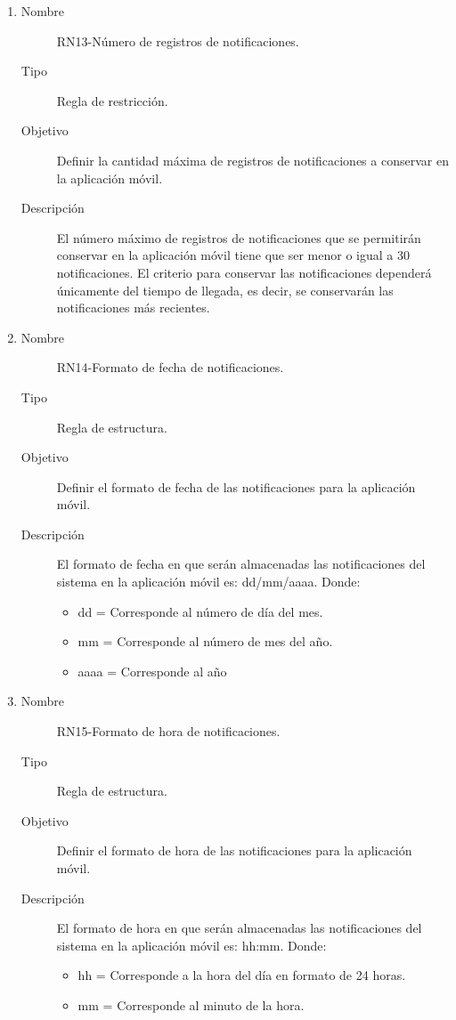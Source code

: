 \begin{enumerate}[label=RN\arabic*.]
\item \label{RN13}
		\begin{description}
			\item[Nombre] RN13-Número de registros de notificaciones.
			\item[Tipo] Regla de restricción.
			\item[Objetivo] Definir la cantidad máxima de registros de notificaciones a conservar en la aplicación móvil.
			\item[Descripción] El número máximo de registros de notificaciones que se permitirán conservar en la aplicación móvil tiene que ser menor o igual a 30 notificaciones. El criterio para conservar las notificaciones dependerá únicamente del tiempo de llegada, es decir, se conservarán las notificaciones más recientes.   
		\end{description}
		
\item \label{RN14}
		\begin{description}
			\item[Nombre] RN14-Formato de fecha de notificaciones.
			\item[Tipo] Regla de estructura.
			\item[Objetivo] Definir el formato de fecha de las notificaciones para la aplicación móvil.
			\item[Descripción] El formato de fecha en que serán almacenadas las notificaciones del sistema en la aplicación móvil es: dd/mm/aaaa.
			Donde:
			\begin{itemize}
		 		\item dd = Corresponde al número de día del mes.
		 		\item mm = Corresponde al número de mes del año.
		 		\item aaaa = Corresponde al año
		    \end{itemize}
		\end{description}
		
\item \label{RN15}
		\begin{description}
			\item[Nombre] RN15-Formato de hora de notificaciones.
			\item[Tipo] Regla de estructura.
			\item[Objetivo] Definir el formato de hora de las notificaciones para la aplicación móvil.
			\item[Descripción] El formato de hora en que serán almacenadas las notificaciones del sistema en la aplicación móvil es: hh:mm.
			Donde:
			\begin{itemize}
		 		\item hh = Corresponde a la hora del día en formato de 24 horas.
		 		\item mm = Corresponde al minuto de la hora.
		    \end{itemize}
		\end{description}


\end{enumerate}